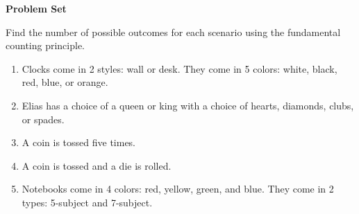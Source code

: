 \textbf{Problem Set}

\vspce

Find the number of possible outcomes for each scenario using the fundamental counting principle. 
\begin{enumerate}[label = \arabic*. ]

\item Clocks come in 2 styles: wall or desk. They come in 5 colors: white, black, red, blue, or orange.
\item Elias has a choice of a queen or king with a choice of hearts, diamonds, clubs, or spades.
\item A coin is tossed five times.
\item A coin is tossed  and a die is rolled. 
\item Notebooks come in 4 colors: red, yellow, green, and blue. They come in 2 types: 5-subject and 7-subject.
\end{enumerate}   
 
